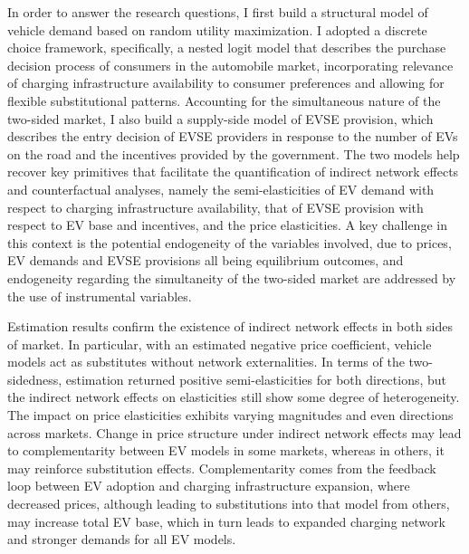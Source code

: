 \documentclass[12pt]{article}
\begin{document}
In order to answer the research questions, I first build a structural model of vehicle demand based on random utility maximization. 
I adopted a discrete choice framework, specifically, a nested logit model that describes the purchase decision process of consumers in the automobile market,
incorporating relevance of charging infrastructure availability to consumer preferences and allowing for flexible substitutional patterns. 
Accounting for the simultaneous nature of the two-sided market, I also build a supply-side model of EVSE provision, 
which describes the entry decision of EVSE providers in response to the number of EVs on the road and the incentives provided by the government.
The two models help recover key primitives that facilitate the quantification of indirect network effects and counterfactual analyses,
namely the semi-elasticities of EV demand with respect to charging infrastructure availability, that of EVSE provision with respect to EV base and incentives, and the price elasticities.
A key challenge in this context is the potential endogeneity of the variables involved, due to prices, EV demands and EVSE provisions all being equilibrium outcomes,
and endogeneity regarding the simultaneity of the two-sided market are addressed by the use of instrumental variables.

Estimation results confirm the existence of indirect network effects in both sides of market. 
In particular, with an estimated negative price coefficient, vehicle models act as substitutes without network externalities. 
In terms of the two-sidedness, estimation returned positive semi-elasticities for both directions, but the indirect network effects on elasticities still show some degree of heterogeneity.
The impact on price elasticities exhibits varying magnitudes and even directions across markets. 
Change in price structure under indirect network effects may lead to complementarity between EV models in some markets, whereas in others, it may reinforce substitution effects.
Complementarity comes from the feedback loop between EV adoption and charging infrastructure expansion, where decreased prices, although leading to substitutions into that model from others,
may increase total EV base, which in turn leads to expanded charging network and stronger demands for all EV models.
\end{document}
